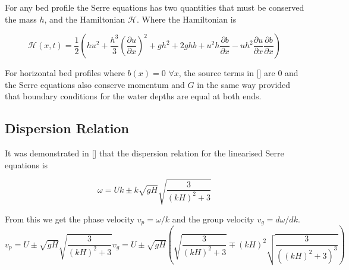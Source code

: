 For any bed profile the Serre equations has two quantities that must be conserved the mass $h$, and the Hamiltonian $\mathcal{H}$. Where the Hamiltonian is

\begin{defn}
	\label{eqn:Hamildef}
	\begin{equation*}
		\mathcal{H}(x,t) = \frac{1}{2} \left(hu^2 + \frac{h^3}{3} \left(\frac{\partial u}{\partial x}\right)^2 + gh^2 + 2ghb + u^2h\frac{\partial b}{\partial x} - uh^2 \frac{\partial u}{\partial x} \frac{\partial b}{\partial x}  \right)
	\end{equation*}

\end{defn}

For horizontal bed profiles where $b(x) = 0$  $\forall x$, the source terms in [] are $0$ and the Serre equations also conserve momentum and $G$ in the same way provided that boundary conditions for the water depths are equal at both ends.


\subsection{Dispersion Relation}
It was demonstrated in [] that the dispersion relation for the linearised Serre equations is

\begin{equation}
\label{eqn:DispersionRelation}
\omega = Uk \pm k \sqrt{gH} \sqrt{\frac{3}{\left(kH\right)^2 + 3}}
\end{equation}

From this we get the phase velocity $v_p = \omega / k$ and the group velocity $v_g = d \omega / d k$.
\begin{subequations}
	\label{eqn:WaveVelocities}
	\begin{equation}
	\label{eqn:WaveVelocitiesPhase}
	v_p = U \pm \sqrt{gH}\sqrt{\frac{3}{\left(kH\right)^2 + 3}}
	\end{equation}
	\begin{equation}
	\label{eqn:WaveVelocitiesGroup}
	v_g = U \pm \sqrt{gH} \left(\sqrt{\frac{3}{\left(kH\right)^2 + 3}} \mp \left(kH\right)^2 \sqrt{\frac{3}{\left(\left(kH\right)^2 + 3 \right)^3}}\right)
	\end{equation}
\end{subequations}



